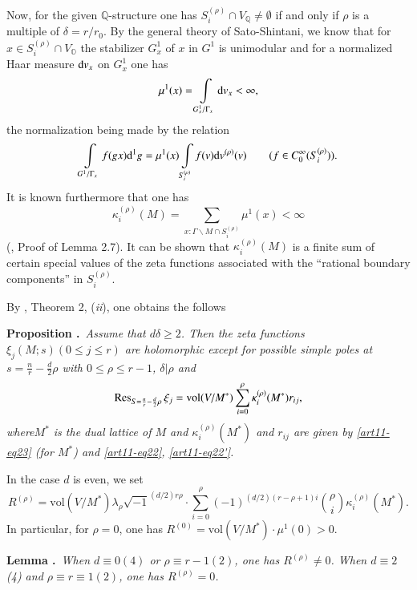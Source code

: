 Now, for the given $\mathbb{Q}$-structure one has $S^{(\rho)}_{i}\cap V_{\mathbb{Q}}\neq \emptyset$ if and only if $\rho$ is a multiple of $\delta=r/r_{0}$. By the general theory of Sato-Shintani, we know that for $x\in S^{(\rho)}_{i}\cap V_{\mathbb{O}}$ the stabilizer $G^{1}_{x}$ of $x$ in $G^{1}$ is unimodular and for a normalized Haar measure $\mathrm{d} v_{x}$ on $G^{1}_{x}$ one has
$$
\mu^{1}(x)=\int\limits_{G^{1}_{x}/\Gamma_{x}}\mathrm{d} v_{x}<\infty,
$$
the normalization being made by the relation
$$
\int\limits_{G^{1}/\Gamma_{x}}f(gx)\mathrm{d}^{1}g=\mu^{1}(x)\int\limits_{S_{i}^{(\rho)}}f(v)\mathrm{d} v^{(\rho)}(v)\qquad (f\in C^{\infty}_{0}(S^{(\rho)}_{i})).
$$
It is known furthermore that one has
\begin{equation}
\kappa_{i}^{(\rho)}(M)=\sum\limits_{x:\Gamma\backslash M\cap S_{i}^{(\rho)}}\mu^{1}(x)<\infty
\end{equation}
(\cite{art11-keySS}, Proof of Lemma 2.7). It can be shown that $\kappa^{(\rho)}_{i}(M)$ is a finite sum of certain special values of the zeta functions associated with the ``rational boundary components'' in $S^{(\rho)}_{i}$.

By \cite{art11-keySS}, Theorem 2, ({\em ii}), one obtains the follows

\medskip
\noindent
{\bf Proposition .\label{art11-prop2}}~{\em Assume that $d\delta \geq 2$. Then the zeta functions $\xi_{j}(M;s)(0\leq j\leq r)$ are holomorphic except for possible simple poles at $s=\frac{n}{r}-\frac{d}{2}\rho$ with $0\leq \rho\leq r-1$, $\delta |\rho$ and}
\begin{equation}
\operatorname{Res}_{S=\frac{n}{r}-\frac{d}{2}\rho}\xi_{j}=\text{vol} (V/M^{*})\sum\limits^{\rho}_{i=0}\kappa^{(\rho)}_{i}(M^{*})r_{ij},\label{art11-eq24}
\end{equation}
{\em where\pageoriginale $M^{*}$ is the dual lattice of $M$ and $\kappa^{(\rho)}_{i}(M^{*})$ and $r_{ij}$ are given by \eqref{art11-eq23} (for $M^{*}$) and \eqref{art11-eq22}, \eqref{art11-eq22'}.}

In the case $d$ is even, we set
\begin{equation}
R^{(\rho)}=\text{vol}(V/M^{*})\lambda_{\rho}\sqrt{-1}^{(d/2)r\rho}\cdot \sum\limits^{\rho}_{i=0}(-1)^{(d/2)(r-\rho+1)i}\binom{\rho}{i}\kappa^{(\rho)}_{i}(M^{*}).\label{art11-eq25}
\end{equation}
In particular, for $\rho=0$, one has $R^{(0)}=\text{vol}(V/M^{*})\cdot \mu^{1}(0)>0$.

\medskip
\noindent
{\bf Lemma .\label{art11-lem4}}~{\em When $d\equiv 0(4)$ or $\rho\equiv r-1(2)$, one has $R^{(\rho)}\neq 0$. When $d\equiv 2$ (4) and $\rho\equiv r\equiv 1(2)$, one has $R^{(\rho)}=0$.}

